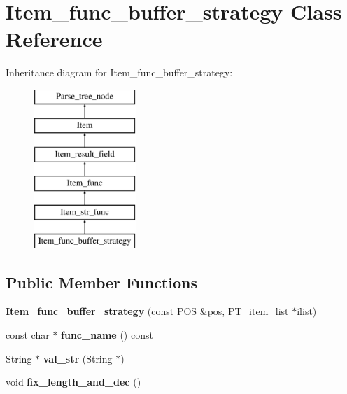\hypertarget{classItem__func__buffer__strategy}{}\section{Item\+\_\+func\+\_\+buffer\+\_\+strategy Class Reference}
\label{classItem__func__buffer__strategy}
Inheritance diagram for Item\+\_\+func\+\_\+buffer\+\_\+strategy\+:\begin{figure}[H]
\begin{center}
\leavevmode
\includegraphics[height=6.000000cm]{classItem__func__buffer__strategy}
\end{center}
\end{figure}
\subsection*{Public Member Functions}
\begin{DoxyCompactItemize}
\item 
\mbox{\label{classItem__func__buffer__strategy_af1b705aa1f5ec4559f6eaadd947431f1}} 
{\bfseries Item\+\_\+func\+\_\+buffer\+\_\+strategy} (const \mbox{\hyperlink{structYYLTYPE}{P\+OS}} \&pos, \mbox{\hyperlink{classPT__item__list}{P\+T\+\_\+item\+\_\+list}} $\ast$ilist)
\item 
\mbox{\label{classItem__func__buffer__strategy_a3fd4286a06e1fb7aed688f78c3cd3ddc}} 
const char $\ast$ {\bfseries func\+\_\+name} () const
\item 
\mbox{\label{classItem__func__buffer__strategy_acb685070902359df555507389de289bc}} 
String $\ast$ {\bfseries val\+\_\+str} (String $\ast$)
\item 
\mbox{\label{classItem__func__buffer__strategy_ac0d5089fb83f859d0ef84465d49a4e5a}} 
void {\bfseries fix\+\_\+length\+\_\+and\+\_\+dec} ()
\end{DoxyCompactItemize}
